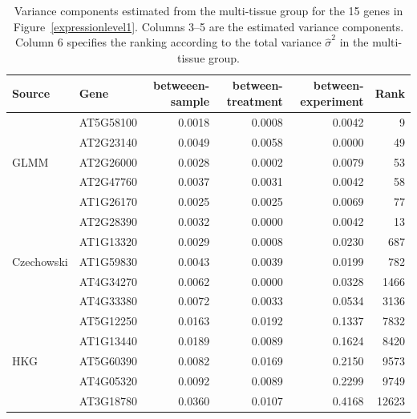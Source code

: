 \documentclass[letterpaper,12pt]{article}
\begin{document}
\begin{table}[]
	\centering
	\caption{Variance components estimated from the multi-tissue group for
	the 15 genes in Figure~\ref{expressionlevel1}.
	Columns 3--5 are the estimated
	variance components. Column 6 specifies the ranking according to the
	total variance $\hat{\sigma}^2$ in the multi-tissue group.}
	\label{table:15genes}
	{\footnotesize\begin{tabular}{llrrrr}\\ \hline
		Source                        & Gene      & betweeen-sample & between-treatment & between-experiment & Rank  \\  \hline
		\multirow{5}{*}{GLMM}    & AT5G58100 & 0.0018          & 0.0008            & 0.0042             & 9     \\
		& AT2G23140 & 0.0049          & 0.0058            & 0.0000             & 49    \\
		& AT2G26000 & 0.0028          & 0.0002            & 0.0079             & 53    \\
		& AT2G47760 & 0.0037          & 0.0031            & 0.0042             & 58    \\
		& AT1G26170 & 0.0025          & 0.0025            & 0.0069             & 77    \\  \hline
		\multirow{5}{*}{Czechowski} & AT2G28390 & 0.0032          & 0.0000            & 0.0042             & 13    \\
		& AT1G13320 & 0.0029          & 0.0008            & 0.0230             & 687   \\
		& AT1G59830 & 0.0043          & 0.0039            & 0.0199             & 782   \\
		& AT4G34270 & 0.0062          & 0.0000            & 0.0328             & 1466  \\
		& AT4G33380 & 0.0072          & 0.0033            & 0.0534             & 3136  \\   \hline
	 \multirow{5}{*}{HKG}              & AT5G12250 & 0.0163          & 0.0192            & 0.1337             & 7832  \\   
		& AT1G13440 & 0.0189          & 0.0089            & 0.1624             & 8420  \\
		& AT5G60390 & 0.0082          & 0.0169            & 0.2150             & 9573  \\
		& AT4G05320 & 0.0092          & 0.0089            & 0.2299             & 9749  \\
		& AT3G18780 & 0.0360          & 0.0107            & 0.4168             & 12623  \\   \hline
	\end{tabular}}
\end{table}
\end{document}
